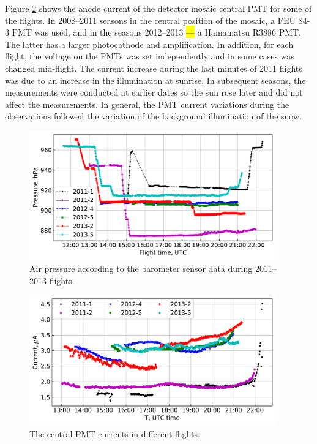 \documentclass[universe,article,accept,moreauthors,pdftex]{Definitions/mdpi}
\begin{document}




 Figure \ref{fig:current} shows the anode current of the detector mosaic central PMT for some of the flights. In 2008--2011 seasons in the central position of the mosaic, a FEU 84-3 PMT was used, and in the seasons 2012--2013 \hl{---} a Hamamatsu R3886 PMT. The latter has a larger photocathode and amplification. In addition, for each flight, the voltage on the PMTs was set independently and in some cases was changed mid-flight. The current increase during the last minutes of 2011 flights was due to an increase in the illumination at sunrise. In subsequent seasons, the measurements were conducted at earlier dates so the sun rose later and did not affect the measurements. In general, the PMT current variations during the observations followed the variation of the background illumination of the snow.
 
 \begin{figure}[H]    
        \includegraphics[width=0.95\textwidth]{Telemetry_pressure.pdf}
        \caption{Air pressure according to the barometer sensor data during 2011--2013 flights.}
        \label{fig:pressure}
        \end{figure}
        \unskip
\begin{figure}[H]
        \includegraphics[width=0.95\textwidth]{hv-53.pdf}
        \caption{The central PMT currents in different flights.}
        \label{fig:current}
\end{figure}
\end{document}
